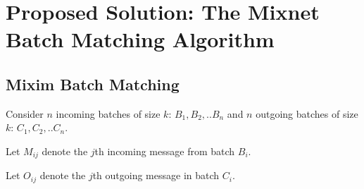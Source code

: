 \documentclass[twocolumn]{article}
\begin{document}
\section{Proposed Solution: The Mixnet Batch Matching Algorithm}
\label{sec:solution}


\subsection{Mixim Batch Matching }

Consider $n$ incoming batches of size $k$: $B_1, B_2,..B_n$ and $n$ outgoing batches of size $k$: $C_1, C_2,..C_n$.

Let $M_{ij}$ denote the $j$th incoming message from batch $B_{i}$.

Let $O_{ij}$ denote the $j$th outgoing message in batch $C_{i}$.
\end{document}

